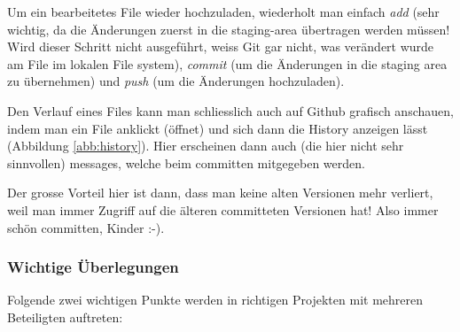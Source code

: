 \documentclass[twoside, 11pr]{article}
\begin{document}
Um ein bearbeitetes File wieder hochzuladen, wiederholt man einfach \textit{add} (sehr wichtig, da die Änderungen zuerst in die staging-area übertragen werden müssen! Wird dieser Schritt nicht ausgeführt, weiss Git gar nicht, was verändert wurde am File im lokalen File system), \textit{commit} (um die Änderungen in die staging area zu übernehmen) und \textit{push} (um die Änderungen hochzuladen).\par
Den Verlauf eines Files kann man schliesslich auch auf Github grafisch anschauen, indem man ein File anklickt (öffnet) und sich dann die History anzeigen lässt (Abbildung \ref{abb:history}). Hier erscheinen dann auch (die hier nicht sehr sinnvollen) messages, welche beim committen mitgegeben werden.\par
Der grosse Vorteil hier ist dann, dass man keine alten Versionen mehr verliert, weil man immer Zugriff auf die älteren committeten Versionen hat! Also immer schön committen, Kinder :-).

\begin{figure}[!tbph]
\end{figure}

\subsubsection{Wichtige Überlegungen}

Folgende zwei wichtigen Punkte werden in richtigen Projekten mit mehreren Beteiligten auftreten:
\end{document}
